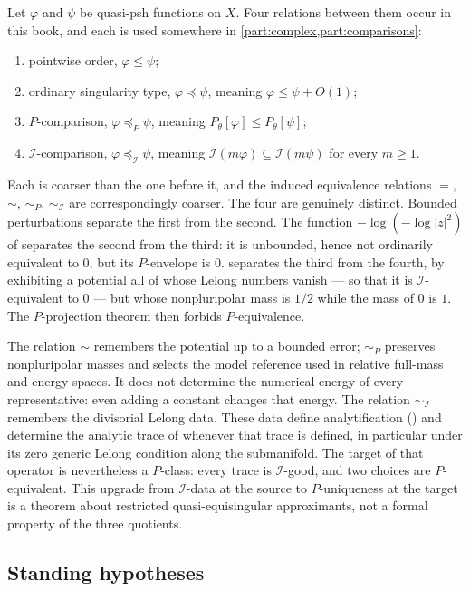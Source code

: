 Let $\varphi$ and $\psi$ be quasi-psh functions on $X$.  Four
relations between them occur in this book, and each is used somewhere in
\cref{part:complex,part:comparisons}:
\begin{enumerate}
\item pointwise order, $\varphi\leq\psi$;
\item ordinary singularity type, $\varphi\preceq\psi$, meaning
      $\varphi\leq\psi+O(1)$;
\item $P$-comparison, $\varphi\preceq_P\psi$, meaning
      $P_\theta[\varphi]\leq P_\theta[\psi]$;
\item $\mathcal I$-comparison, $\varphi\preceq_{\mathcal I}\psi$,
      meaning $\mathcal I(m\varphi)\subseteq\mathcal I(m\psi)$ for every
      $m\geq1$.
\end{enumerate}
Each is coarser than the one before it, and the induced equivalence
relations $=$, $\sim$, $\sim_P$, $\sim_{\mathcal I}$ are
correspondingly coarser.  The four are genuinely distinct.  Bounded
perturbations separate the first from the second.  The function
$-\log(-\log|z|^2)$ of  separates the second from
the third: it is unbounded, hence not ordinarily equivalent to $0$, but
its $P$-envelope is $0$.   separates the third
from the fourth, by exhibiting a potential all of whose Lelong numbers
vanish --- so that it is $\mathcal I$-equivalent to $0$ --- but whose
nonpluripolar mass is $1/2$ while the mass of $0$ is $1$.  The
$P$-projection theorem then forbids $P$-equivalence.

The relation $\sim$ remembers the potential up to a bounded error;
$\sim_P$ preserves nonpluripolar masses and selects the model reference
used in relative full-mass and energy spaces.  It does not determine the
numerical energy of every representative: even adding a constant changes
that energy.  The relation $\sim_{\mathcal I}$ remembers the divisorial
Lelong data.  These data define analytification
() and determine the analytic trace
of  whenever that trace is defined, in
particular under its zero generic Lelong condition along the submanifold.
The target of
that operator is nevertheless a $P$-class: every trace is
$\mathcal I$-good, and two choices are $P$-equivalent.  This upgrade
from $\mathcal I$-data at the source to $P$-uniqueness at the target is
a theorem about restricted quasi-equisingular approximants, not a formal
property of the three quotients.

\subsection{Standing hypotheses}
\label{sec:ch51-hypotheses}


